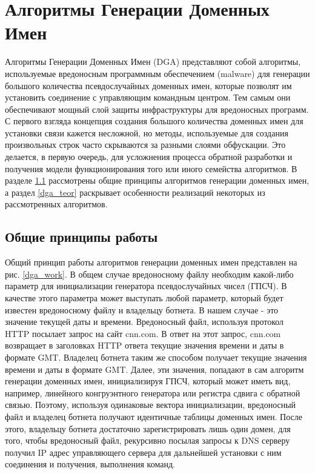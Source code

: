 \section{Алгоритмы Генерации Доменных Имен}\label{dga}
Алгоритмы Генерации Доменных Имен (DGA) представляют собой алгоритмы, используемые вредоносным программным обеспечением (malware) для генерации большого количества псевдослучайных доменных имен, которые позволят им установить соединение с управляющим командным центром. Тем самым они обеспечивают мощный слой защиты инфраструктуры для вредоносных программ. С первого взгляда концепция создания большого количества доменных имен для установки связи кажется несложной, но методы, используемые для создания произвольных строк часто скрываются за разными слоями обфускации. Это делается, в первую очередь, для усложнения процесса обратной разработки и получения модели функционирования того или иного семейства алгоритмов. В разделе \ref{work_princip} рассмотрены общие принципы алгоритмов генерации доменных имен, а раздел \ref{dga_teor} раскрывает особенности реализаций некоторых из рассмотренных алгоритмов.

    \subsection{Общие принципы работы}\label{work_princip}
        Общий принцип работы алгоритмов генерации доменных имен представлен на рис. \ref{dga_work}. В общем случае вредоносному файлу необходим какой-либо параметр для инициализации генератора псевдослучайных чисел (ГПСЧ). В качестве этого параметра может выступать любой параметр, который будет известен вредоносному файлу и владельцу ботнета. В нашем случае - это значение текущей даты и времени. Вредоносный файл, используя протокол HTTP посылает запрос на сайт cnn.com. В ответ на этот запрос, cnn.com возвращает в заголовках HTTP ответа текущие значения времени и даты в формате GMT. Владелец ботнета таким же способом получает текущие значения времени и даты в формате GMT. Далее, эти значения, попадают в сам алгоритм генерации доменных имен, инициализируя ГПСЧ, который может иметь вид, например, линейного конгруэнтного генератора или  регистра сдвига с обратной связью. Поэтому, используя одинаковые вектора инициализации, вредоносный файл и владелец ботнета получают идентичные таблицы доменных имен.
        После этого, владельцу ботнета достаточно зарегистрировать лишь один домен, для того, чтобы вредоносный файл, рекурсивно посылая запросы к DNS серверу получил IP адрес управляющего сервера для дальнейшей установки с ним соединения и получения, выполнения команд.

